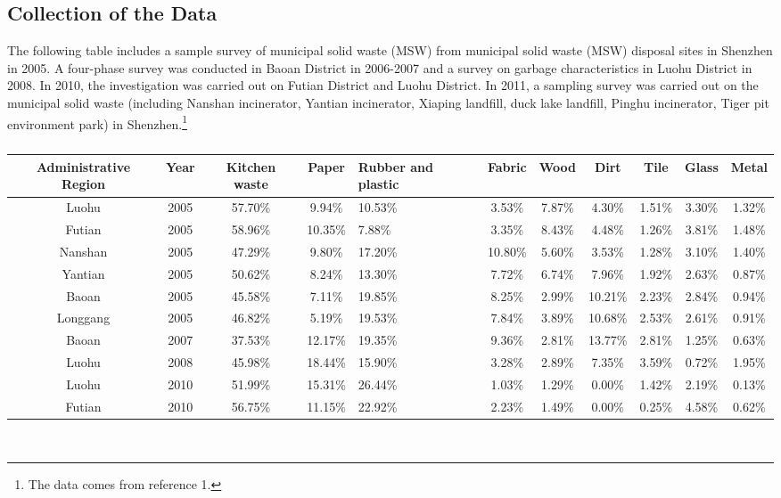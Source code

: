 \documentclass[UTF8]{article}
\begin{document}
\subsection{Collection of the Data}
The following table includes a sample survey of municipal solid waste (MSW) from municipal solid waste (MSW) disposal sites in Shenzhen in 2005. A four-phase survey was conducted in Baoan District in 2006-2007 and a survey on garbage characteristics in Luohu District in 2008. In 2010, the investigation was carried out on Futian District and Luohu District. In 2011, a sampling survey was carried out on the municipal solid waste (including Nanshan incinerator, Yantian incinerator, Xiaping landfill, duck lake landfill, Pinghu incinerator, Tiger pit environment park) in Shenzhen.\footnote{The data comes from reference 1.}
\begin{table}[h]
\caption{}
\begin{center}
\begin{tabular}{ccccp{1cm}cccccc}
\hline
Administrative Region&Year&Kitchen waste&Paper&Rubber and plastic&Fabric&Wood&Dirt&Tile&Glass&Metal\\
\hline
Luohu&2005&57.70\%&9.94\%&10.53\%&3.53\%&7.87\%&4.30\%&1.51\%&3.30\%&1.32\%\\
\hline
Futian&2005&58.96\%&10.35\%&7.88\%&3.35\%&8.43\%&4.48\%&1.26\%&3.81\%&1.48\%\\
\hline
Nanshan&2005&47.29\%&9.80\%&17.20\%&10.80\%&5.60\%&3.53\%&1.28\%&3.10\%&1.40\%\\
\hline
Yantian&2005&50.62\%&8.24\%&13.30\%&7.72\%&6.74\%&7.96\%&1.92\%&2.63\%&0.87\%\\
\hline
Baoan&2005&45.58\%&7.11\%&19.85\%&8.25\%&2.99\%&10.21\%&2.23\%&2.84\%&0.94\%\\
\hline
Longgang&2005&46.82\%&5.19\%&19.53\%&7.84\%&3.89\%&10.68\%&2.53\%&2.61\%&0.91\%\\
\hline
Baoan&2007&37.53\%&12.17\%&19.35\%&9.36\%&2.81\%&13.77\%&2.81\%&1.25\%&0.63\%\\
\hline
Luohu&2008&45.98\%&18.44\%&15.90\%&3.28\%&2.89\%&7.35\%&3.59\%&0.72\%&1.95\%\\
\hline
Luohu&2010&51.99\%&15.31\%&26.44\%&1.03\%&1.29\%&0.00\%&1.42\%&2.19\%&0.13\%\\
\hline
Futian&2010&56.75\%&11.15\%&22.92\%&2.23\%&1.49\%&0.00\%&0.25\%&4.58\%&0.62\%\\
\hline
\end{tabular}
\end{center}
\end{table}\\
\end{document}
